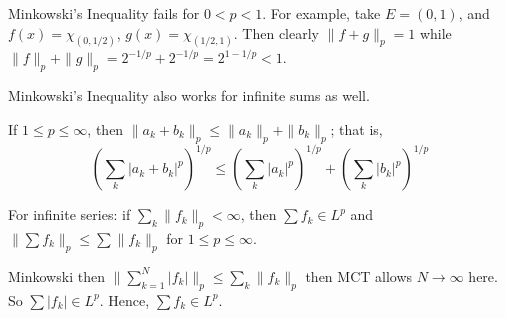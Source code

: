 \begin{rem}
Minkowski's Inequality fails for $0<p<1$. For example, take $E=(0,1)$, and $f(x)= \chi_{(0,1/2)}$, $g(x)= \chi_{(1/2,1)}$. Then clearly $\|f+g\|_p=1$ while $\|f\|_p+\|g\|_p= 2^{-1/p} + 2^{-1/p}= 2^{1-1/p}<1$. 
\end{rem}


Minkowski's Inequality also works for infinite sums as well.


\begin{thm}
If $1 \leq p \leq \infty$, then $\|a_k+b_k\|_p \leq \|a_k\|_p + \|b_k\|_p$; that is,
	\[
	\left( \sum_k |a_k+b_k|^p \right)^{1/p} \leq \left( \sum_k |a_k|^p \right)^{1/p} + \left( \sum_k |b_k|^p \right)^{1/p}
	\]
\end{thm}


























For infinite series: if $\sum_k \|f_k\|_p < \infty$, then $\sum f_k \in L^p$ and $\| \sum f_k \|_p \leq \sum \|f_k\|_p$ for $1 \leq p \leq \infty$. 

\pf Minkowski then $\| \sum_{k=1}^N |f_k|\|_p \leq \sum_k \|f_k\|_p$ then MCT allows $N \to \infty$ here. So $\sum |f_k| \in L^p$. Hence, $\sum f_k \in L^p$.















































